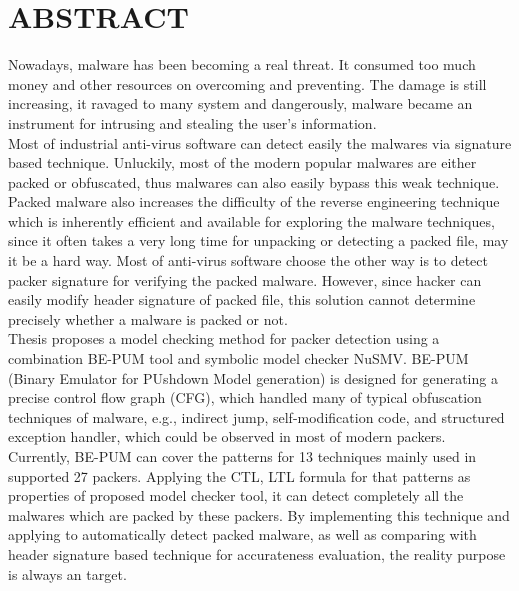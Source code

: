 
\newpage
\chapter{ABSTRACT}

\setlength\parindent{0pt}

\hspace{0.5cm}Nowadays, malware has been becoming a real threat. It consumed too much money and other resources on overcoming and preventing. The damage is still increasing, it ravaged to many system and dangerously, malware became an instrument for intrusing and stealing the user's information.\\

\hspace{0.5cm}Most of industrial anti-virus software can detect easily the malwares via signature based technique. Unluckily, most of the modern popular malwares are either packed or obfuscated, thus malwares can also easily bypass this weak technique. Packed malware also increases the difficulty of the reverse engineering technique which is inherently efficient and available for exploring the malware techniques, since it often takes a very long time for unpacking or detecting a packed file, may it be a hard way. Most of anti-virus software choose the other way is to detect packer signature for verifying the packed malware. However, since hacker can easily modify header signature of packed file, this solution cannot determine precisely whether a malware is packed or not.\\

\hspace{0.5cm}Thesis proposes a model checking method for packer detection using a combination BE-PUM tool and symbolic model checker NuSMV. BE-PUM (Binary Emulator for PUshdown Model generation) is designed for generating a precise control flow graph (CFG), which handled many of typical obfuscation techniques of malware, e.g., indirect jump, self-modification code, and structured exception handler, which could be observed in most of modern packers. Currently, BE-PUM can cover the patterns for 13 techniques mainly used in supported 27 packers. Applying the CTL, LTL formula for that patterns as properties of proposed model checker tool, it can detect completely all the malwares which are packed by these packers. By implementing this technique and applying to automatically detect packed malware, as well as comparing with header signature based technique for accurateness evaluation, the reality purpose is always an target.

